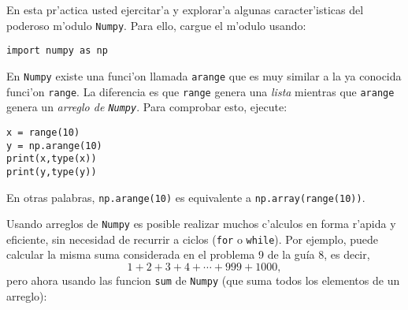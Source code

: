 \documentclass[11pt]{exam}
\begin{document}
\firstpageheadrule
\runningheadrule
{}
\cfoot{ }
\begin{flushleft}
\vspace{0.2in}

\vspace{0.25cm}
\end{flushleft}

\begin{questions}


\item En esta pr'actica usted ejercitar'a y explorar'a algunas caracter'isticas del poderoso m'odulo \texttt{Numpy}. Para ello, cargue el m'odulo usando:

\begin{verbatim}
import numpy as np
\end{verbatim}

\item En \texttt{Numpy} existe una funci'on llamada \texttt{arange} que es muy similar a la ya conocida funci'on \texttt{range}. La diferencia es que \texttt{range} genera una \textit{lista} mientras que \texttt{arange} genera un \textit{arreglo de \texttt{Numpy}}. Para comprobar esto, ejecute:

\begin{verbatim}
x = range(10)
y = np.arange(10)
print(x,type(x))
print(y,type(y))
\end{verbatim}

En otras palabras, \texttt{np.arange(10)} es equivalente a \texttt{np.array(range(10))}.

\item Usando arreglos de \texttt{Numpy} es posible realizar muchos c'alculos en forma r'apida y eficiente, sin necesidad de recurrir a ciclos (\texttt{for} o \texttt{while}). Por ejemplo, puede calcular la misma suma considerada en el problema 9 de la guía 8, es decir, 
\begin{equation}
1 + 2 + 3 + 4  + \cdots + 999 + 1000,
\end{equation}
pero ahora usando las funcion \texttt{sum} de \texttt{Numpy} (que suma todos los elementos de un arreglo):


\end{questions}
\end{document}
